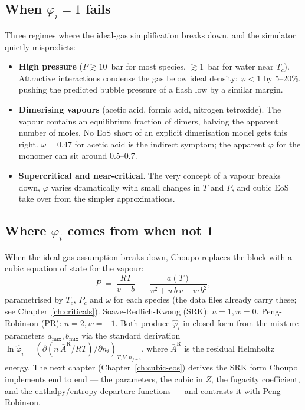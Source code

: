 \documentclass[11pt,a4paper]{article}
\begin{document}
\subsection{When $\varphi_i = 1$ fails}

Three regimes where the ideal-gas simplification breaks down,
and the simulator quietly mispredicts:

\begin{itemize}[leftmargin=*,nosep]
  \item \textbf{High pressure} ($P \gtrsim 10$~bar for most species,
        $\gtrsim 1$~bar for water near $T_c$).  Attractive
        interactions condense the gas below ideal density;
        $\varphi < 1$ by 5--20\%, pushing the predicted bubble
        pressure of a flash low by a similar margin.
  \item \textbf{Dimerising vapours} (acetic acid, formic acid,
        nitrogen tetroxide).  The vapour contains an
        equilibrium fraction of dimers, halving the apparent
        number of moles.  No EoS short of an explicit dimerisation
        model gets this right.  $\omega = 0.47$ for acetic acid is
        the indirect symptom; the apparent $\varphi$ for the monomer
        can sit around 0.5--0.7.
  \item \textbf{Supercritical and near-critical}.  The very concept
        of a vapour breaks down, $\varphi$ varies dramatically with
        small changes in $T$ and $P$, and cubic EoS take over from
        the simpler approximations.
\end{itemize}

\subsection{Where $\varphi_i$ comes from when not 1}

When the ideal-gas assumption breaks down, Choupo replaces the
 block with a cubic equation of state for the vapour:
\[
   P \;=\; \frac{RT}{v - b} \;-\; \frac{a(T)}{v^2 + u\,b\,v + w\,b^2},
\]
parametrised by $T_c$, $P_c$ and $\omega$ for each species (the
data files already carry these; see
Chapter~\ref{ch:criticals}).  Soave-Redlich-Kwong (SRK): $u = 1, w = 0$.
Peng-Robinson (PR): $u = 2, w = -1$.  Both produce $\hat\varphi_i$
in closed form from the mixture parameters $a_{\mathrm{mix}},
b_{\mathrm{mix}}$ via the standard derivation
$\ln \hat\varphi_i = (\partial(n\,\bar A^{\mathrm{R}}/RT) /
\partial n_i)_{T, V, n_{j \neq i}}$, where $\bar A^{\mathrm{R}}$ is
the residual Helmholtz energy.  The next chapter
(Chapter~\ref{ch:cubic-eos}) derives the SRK form Choupo implements
end to end --- the parameters, the cubic in $Z$, the fugacity
coefficient, and the enthalpy/entropy departure functions --- and
contrasts it with Peng-Robinson.
\end{document}
